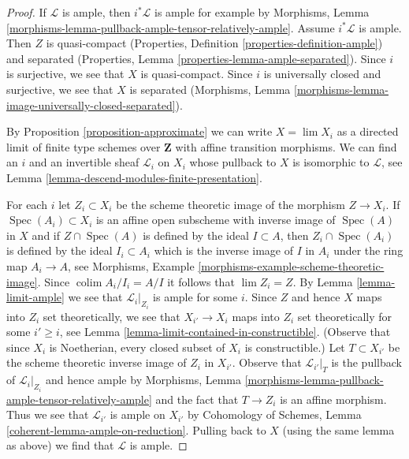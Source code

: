 \documentclass{stacks-project}
\theoremstyle{plain}
\theoremstyle{definition}
\theoremstyle{remark}
\numberwithin{equation}{subsection}
\def\lim{\mathop{\mathrm{lim}}\nolimits}
\def\colim{\mathop{\mathrm{colim}}\nolimits}
\def\Spec{\mathop{\mathrm{Spec}}}
\begin{document}
\begin{proof}
If $\mathcal{L}$ is ample, then $i^*\mathcal{L}$ is ample for
example by Morphisms, Lemma
\ref{morphisms-lemma-pullback-ample-tensor-relatively-ample}.
Assume $i^*\mathcal{L}$ is ample. Then $Z$ is quasi-compact
(Properties, Definition \ref{properties-definition-ample})
and separated
(Properties, Lemma \ref{properties-lemma-ample-separated}).
Since $i$ is surjective, we see that $X$ is quasi-compact.
Since $i$ is universally closed and surjective, we see that
$X$ is separated (Morphisms, Lemma
\ref{morphisms-lemma-image-universally-closed-separated}).

\medskip\noindent
By Proposition \ref{proposition-approximate} we can write
$X = \lim X_i$ as a directed limit of finite type schemes over $\mathbf{Z}$
with affine transition morphisms. We can find an $i$ and an invertible
sheaf $\mathcal{L}_i$ on $X_i$ whose pullback to $X$ is isomorphic to
$\mathcal{L}$, see Lemma \ref{lemma-descend-modules-finite-presentation}.

\medskip\noindent
For each $i$ let $Z_i \subset X_i$ be the scheme theoretic image
of the morphism $Z \to X_i$. If $\Spec(A_i) \subset X_i$ is an affine
open subscheme with inverse image of $\Spec(A)$ in $X$ and if
$Z \cap \Spec(A)$ is defined by the ideal $I \subset A$, then
$Z_i \cap \Spec(A_i)$ is defined by the ideal $I_i \subset A_i$
which is the inverse image of $I$ in $A_i$ under the ring map
$A_i \to A$, see
Morphisms, Example \ref{morphisms-example-scheme-theoretic-image}.
Since $\colim A_i/I_i = A/I$ it follows that $\lim Z_i = Z$.
By Lemma \ref{lemma-limit-ample} we see that $\mathcal{L}_i|_{Z_i}$
is ample for some $i$. Since $Z$ and hence $X$ maps into $Z_i$
set theoretically, we see that $X_{i'} \to X_i$ maps into $Z_i$
set theoretically for some $i' \geq i$, see
Lemma \ref{lemma-limit-contained-in-constructible}.
(Observe that since $X_i$ is Noetherian, every closed subset
of $X_i$ is constructible.) Let $T \subset X_{i'}$
be the scheme theoretic inverse image of $Z_i$ in $X_{i'}$.
Observe that $\mathcal{L}_{i'}|_T$ is the pullback
of $\mathcal{L}_i|_{Z_i}$ and hence ample by
Morphisms, Lemma \ref{morphisms-lemma-pullback-ample-tensor-relatively-ample}
and the fact that $T \to Z_i$ is an affine morphism.
Thus we see that $\mathcal{L}_{i'}$ is ample on $X_{i'}$
by Cohomology of Schemes, Lemma \ref{coherent-lemma-ample-on-reduction}.
Pulling back to $X$ (using the same lemma as above)
we find that $\mathcal{L}$ is ample.
\end{proof}
\end{document}

